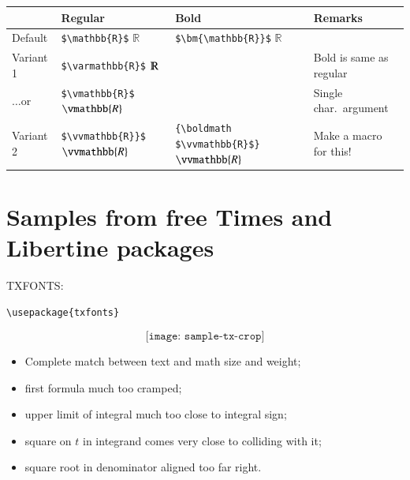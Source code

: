 \documentclass[11pt]{article}
\begin{document}
\begin{center}
  \begin{tabular}{@{} llll @{}}
    \toprule
     & Regular & Bold & Remarks \\ 
    \midrule
Default  & \verb|$\mathbb{R}$| $\mathbb{R}$& \verb|$\bm{\mathbb{R}}$| $\bm{\mathbb{R}}$\\ 
Variant 1     & \verb|$\varmathbb{R}$| $\varmathbb{R}$ &  & Bold is same as regular \\ 
$\dots$or     & \verb|$\vmathbb{R}$| $\vmathbb{R}$ &  & Single char.\ argument\\ 
Variant 2 & \verb|$\vvmathbb{R}}$| $\vvmathbb{R}$& \verb|{\boldmath $\vvmathbb{R}$}| {\boldmath $\vvmathbb{R}$} & Make a macro for this! \\ 
    \bottomrule
  \end{tabular}
\end{center}

\section{Samples from free Times and Libertine packages}
\textsc{TXFONTS:}\\
\begin{verbatim}
\usepackage{txfonts}
\end{verbatim}
\[\texttt{[image: sample-tx-crop]}\]
\begin{itemize}
\item
Complete match between text and math size and weight;
\item first formula much too cramped;
\item upper limit of integral much too close to integral sign;
\item square on $t$ in integrand comes very close to colliding with it;
\item square root in denominator aligned too far right.
\end{itemize}
\end{document}
